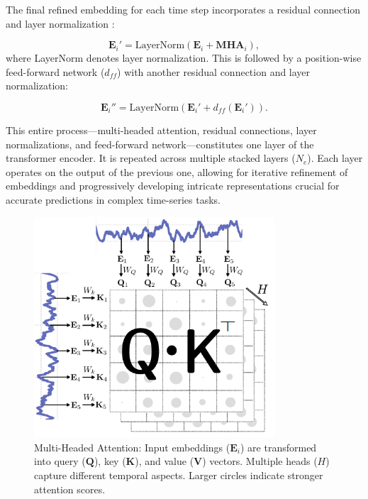 \documentclass{ieeetmlcn}
\begin{document}
The final refined embedding for each time step incorporates a residual connection \cite{he2016deep} and layer normalization \cite{lei2016layer}:

\begin{equation}
    \mathbf{E}_i' = \text{LayerNorm}(\mathbf{E}_i + \mathbf{MHA}_i),
\end{equation}
where LayerNorm denotes layer normalization. This is followed by a position-wise feed-forward network ($d_{ff}$) with another residual connection and layer normalization:

\begin{equation}
    \mathbf{E}_i'' = \text{LayerNorm}(\mathbf{E}_i' + d_{ff}(\mathbf{E}_i')).
\end{equation}

This entire process—multi-headed attention, residual connections, layer normalizations, and feed-forward network—constitutes one layer of the transformer encoder. It is repeated across multiple stacked layers ($N_e$). Each layer operates on the output of the previous one, allowing for iterative refinement of embeddings and progressively developing intricate representations crucial for accurate predictions in complex time-series tasks.

\begin{figure}\centering
\centering
\centering\includegraphics[width=0.8\textwidth]{img/attention_workings.png}
\caption{Multi-Headed Attention: Input embeddings ($\mathbf{E}_i$) are transformed into query ($\mathbf{Q}$), key ($\mathbf{K}$), and value ($\mathbf{V}$) vectors. Multiple heads ($H$) capture different temporal aspects. Larger circles indicate stronger attention scores.}
\label{fig:attention_workings}
\end{figure}
\end{document}
